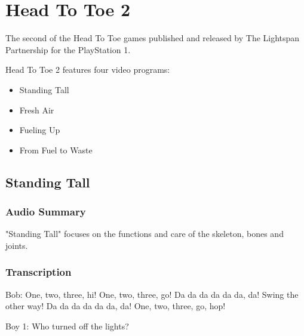 \chapter{Head To Toe 2}


The second of the Head To Toe games published and released by The Lightspan Partnership for the PlayStation 1.

Head To Toe 2 features four video programs:

\begin{itemize}
    \item Standing Tall
    \item Fresh Air
    \item Fueling Up
    \item From Fuel to Waste
\end{itemize}

\clearpage
\newpage

\section{Standing Tall}

\subsection{Audio Summary}

"Standing Tall" focuses on the functions and care of the skeleton, bones and joints.

\subsection{Transcription}

Bob: One, two, three, hi! One, two, three, go! Da da da da da da, da! Swing the other way! Da da da da da da, da! One, two, three, go, hop!

Boy 1: Who turned off the lights?

